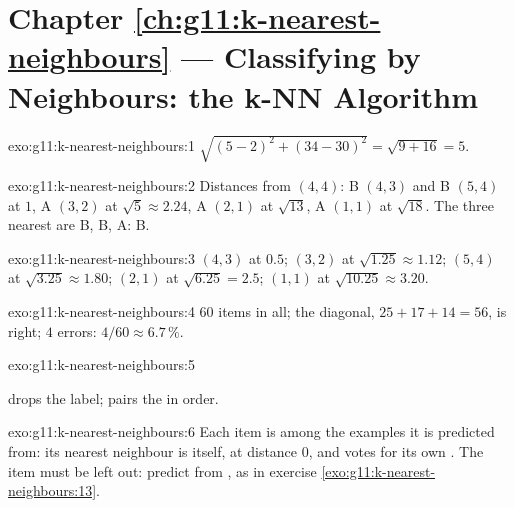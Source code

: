 \section*{Chapter \ref{ch:g11:k-nearest-neighbours} --- Classifying by Neighbours: the k-NN Algorithm}

\begin{solution}{exo:g11:k-nearest-neighbours:1}
$\sqrt{(5 - 2)^2 + (34 - 30)^2} = \sqrt{9 + 16} = 5$.
\end{solution}

\begin{solution}{exo:g11:k-nearest-neighbours:2}
Distances from $(4, 4)$: B $(4, 3)$ and B $(5, 4)$ at $1$, A $(3, 2)$ at $\sqrt{5} \approx 2.24$, A $(2, 1)$ at
$\sqrt{13}$, A $(1, 1)$ at $\sqrt{18}$. The three nearest are B, B, A:  B.
\end{solution}

\begin{solution}{exo:g11:k-nearest-neighbours:3}
$(4, 3)$ at $0.5$; $(3, 2)$ at $\sqrt{1.25} \approx 1.12$; $(5, 4)$ at $\sqrt{3.25} \approx 1.80$; $(2, 1)$ at
$\sqrt{6.25} = 2.5$; $(1, 1)$ at $\sqrt{10.25} \approx 3.20$.
\end{solution}

\begin{solution}{exo:g11:k-nearest-neighbours:4}
$60$ items in all; the diagonal, $25 + 17 + 14 = 56$, is right; $4$ errors: $4/60 \approx 6.7\,\%$.
\end{solution}

\begin{solution}{exo:g11:k-nearest-neighbours:5}
\smallskip\noindent\hspace*{2em}

\noindent\hspace*{4em}

\smallskip\noindent {} drops the label;  pairs the  in order.
\end{solution}

\begin{solution}{exo:g11:k-nearest-neighbours:6}
Each item is among the examples it is predicted from: its nearest neighbour is itself, at distance $0$, and votes for
its own . The item must be left out: predict  from , as in
exercise \ref{exo:g11:k-nearest-neighbours:13}.
\end{solution}

